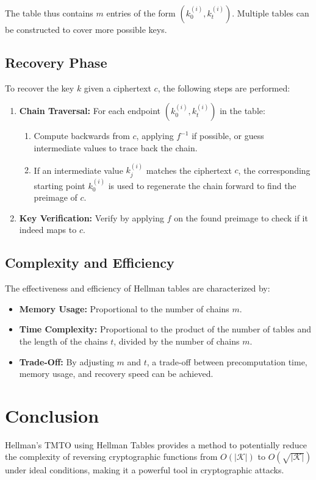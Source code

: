 The table thus contains $m$ entries of the form $(k_0^{(i)}, k_t^{(i)})$. Multiple tables can be constructed to cover more possible keys.

\subsection*{Recovery Phase}

To recover the key $k$ given a ciphertext $c$, the following steps are performed:

\begin{enumerate}
	\item \textbf{Chain Traversal:} For each endpoint $(k_0^{(i)}, k_t^{(i)})$ in the table:
	\begin{enumerate}
		\item Compute backwards from $c$, applying $f^{-1}$ if possible, or guess intermediate values to trace back the chain.
		\item If an intermediate value $k_j^{(i)}$ matches the ciphertext $c$, the corresponding starting point $k_0^{(i)}$ is used to regenerate the chain forward to find the preimage of $c$.
	\end{enumerate}
	\item \textbf{Key Verification:} Verify by applying $f$ on the found preimage to check if it indeed maps to $c$.
\end{enumerate}

\subsection*{Complexity and Efficiency}

The effectiveness and efficiency of Hellman tables are characterized by:
\begin{itemize}
	\item \textbf{Memory Usage:} Proportional to the number of chains $m$.
	\item \textbf{Time Complexity:} Proportional to the product of the number of tables and the length of the chains $t$, divided by the number of chains $m$.
	\item \textbf{Trade-Off:} By adjusting $m$ and $t$, a trade-off between precomputation time, memory usage, and recovery speed can be achieved.
\end{itemize}

\section*{Conclusion}

Hellman's TMTO using Hellman Tables provides a method to potentially reduce the complexity of reversing cryptographic functions from $O(|\mathcal{K}|)$ to $O(\sqrt{|\mathcal{K}|})$ under ideal conditions, making it a powerful tool in cryptographic attacks.
